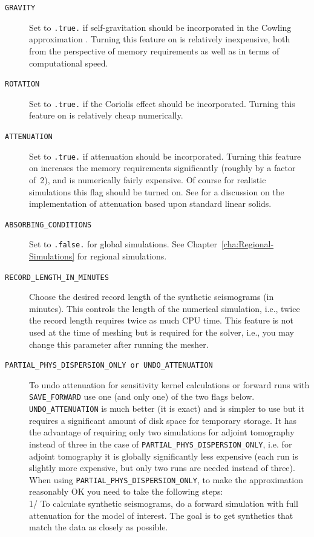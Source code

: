 \documentclass[oneside,english]{book}
\begin{document}
\begin{description}
\item [{\texttt{GRAVITY}}] Set to \texttt{.true.} if self-gravitation should
be incorporated in the Cowling approximation \citep{KoTr02b,DaTr98}.
Turning this feature on is relatively inexpensive, both from the perspective
of memory requirements as well as in terms of computational speed.
\item [{\texttt{ROTATION}}] Set to \texttt{.true.} if the Coriolis effect
should be incorporated. Turning this feature on is relatively cheap
numerically.
\item [{\texttt{ATTENUATION}}] Set to \texttt{.true.} if attenuation should
be incorporated. Turning this feature on increases the memory requirements
significantly (roughly by a factor of~2), and is numerically fairly
expensive. Of course for realistic simulations this flag should be
turned on. See \citet{KoTr99,KoTr02a} for a discussion on the implementation
of attenuation based upon standard linear solids.
\item [{\texttt{ABSORBING\_CONDITIONS}}] Set to \texttt{.false.} for global
simulations. See Chapter~\ref{cha:Regional-Simulations} for regional
simulations.
\item [{\texttt{RECORD\_LENGTH\_IN\_MINUTES}}] Choose the desired record
length of the synthetic seismograms (in minutes). This controls the
length of the numerical simulation, i.e., twice the record length
requires twice as much CPU time. This feature is not used at the time
of meshing but is required for the solver, i.e., you may change this
parameter after running the mesher.
\item [{\texttt{PARTIAL\_PHYS\_DISPERSION\_ONLY or UNDO\_ATTENUATION}}] To undo attenuation for sensitivity kernel calculations or forward runs with \texttt{SAVE\_FORWARD}
use one (and only one) of the two flags below. \texttt{UNDO\_ATTENUATION} is much better (it is exact) and is simpler to use
but it requires a significant amount of disk space for temporary storage. It has the advantage of requiring only two simulations for adjoint tomography instead
of three in the case of \texttt{PARTIAL\_PHYS\_DISPERSION\_ONLY}, i.e. for adjoint tomography it is globally significantly less expensive (each run is slightly more
expensive, but only two runs are needed instead of three).\\
When using \texttt{PARTIAL\_PHYS\_DISPERSION\_ONLY}, to make the approximation reasonably OK you need to take the following steps:\\
1/ To calculate synthetic seismograms, do a forward simulation with full attenuation for the model of interest. The goal is to get synthetics that match the data as closely as possible.\\

\end{description}
\end{document}
